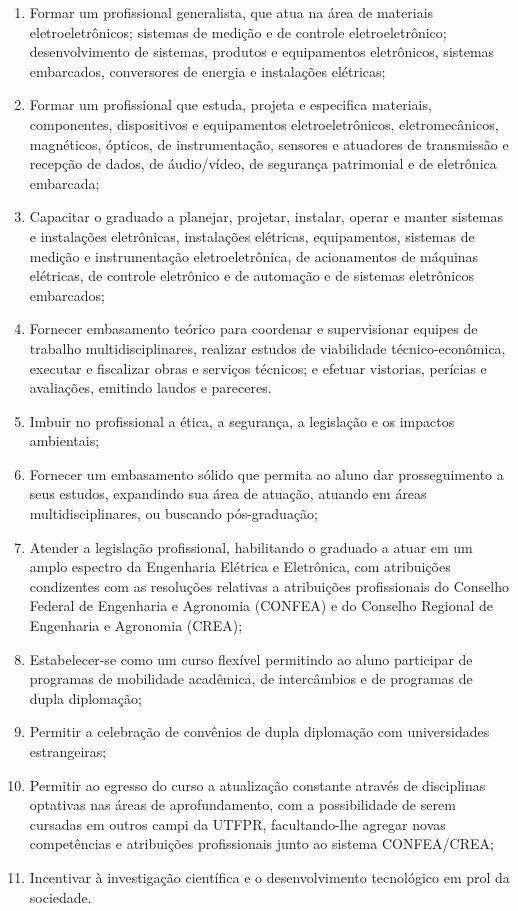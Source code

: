 \begin{enumerate}
	\item	Formar um profissional generalista, que atua na área de materiais eletroeletrônicos; sistemas de medição e de controle eletroeletrônico; desenvolvimento de sistemas, produtos e equipamentos eletrônicos, sistemas embarcados, conversores de energia e instalações elétricas;
	\item	Formar um profissional que estuda, projeta e especifica materiais, componentes, dispositivos e equipamentos eletroeletrônicos, eletromecânicos, magnéticos, ópticos, de instrumentação, sensores e atuadores de transmissão e recepção de dados, de áudio/vídeo, de segurança patrimonial e de eletrônica embarcada;
	\item	Capacitar o graduado a planejar, projetar, instalar, operar e manter sistemas e instalações eletrônicas, instalações elétricas, equipamentos, sistemas de medição e instrumentação eletroeletrônica, de acionamentos de máquinas elétricas, de controle eletrônico e de automação e de sistemas eletrônicos embarcados;
	\item	Fornecer embasamento teórico para coordenar e supervisionar equipes de trabalho multidisciplinares, realizar estudos de viabilidade técnico-econômica, executar e fiscalizar obras e serviços técnicos; e efetuar vistorias, perícias e avaliações, emitindo laudos e pareceres.
	\item	Imbuir no profissional a ética, a segurança, a legislação e os impactos ambientais;
	\item	Fornecer um embasamento sólido que permita ao aluno dar prosseguimento a seus estudos, expandindo sua área de atuação, atuando em áreas multidisciplinares, ou buscando pós-graduação;
	\item	Atender a legislação profissional, habilitando o graduado a atuar em um amplo espectro da Engenharia Elétrica e Eletrônica, com atribuições condizentes com as resoluções relativas a atribuições profissionais do Conselho Federal de Engenharia e Agronomia (CONFEA) e do Conselho Regional de Engenharia e Agronomia (CREA);
	\item	Estabelecer-se como um curso flexível permitindo ao aluno participar de programas de mobilidade acadêmica, de intercâmbios e de programas de dupla diplomação;
	\item	Permitir a celebração de convênios de dupla diplomação com universidades estrangeiras;
	\item	Permitir ao egresso do curso a atualização constante através de disciplinas optativas nas áreas de aprofundamento, com a possibilidade de serem cursadas em outros campi da UTFPR, facultando-lhe agregar novas competências e atribuições profissionais junto ao sistema CONFEA/CREA;
	\item Incentivar à investigação científica e o desenvolvimento tecnológico em prol da sociedade.
\end{enumerate}

